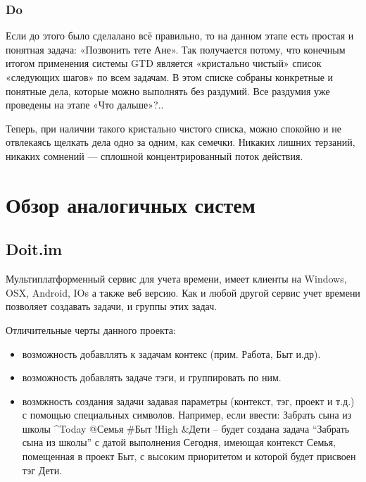 \subsubsection{Do }

Если до этого было сделалано всё правильно, то на данном этапе есть простая и понятная задача: «Позвонить тете Ане».
Так получается потому, что конечным итогом применения системы GTD является «кристально чистый» список «следующих шагов» по всем задачам. В этом списке собраны конкретные и понятные дела, которые можно выполнять без раздумий. Все раздумия уже проведены на этапе «Что дальше»?..

Теперь, при наличии такого кристально чистого списка, можно спокойно и не отвлекаясь щелкать дела одно за одним, как семечки. Никаких лишних терзаний, никаких сомнений — сплошной концентрированный поток действия. 

\section{Обзор аналогичных систем} 
\label{sec:practice:analogs}

\subsection{Doit.im}
\label{sub:practice:analogs:doit}
Мультиплатформенный  сервис для учета времени, имеет клиенты на Windows, OSX, Android, IOs а также веб версию. Как и любой другой сервис учет времени позволяет создавать задачи, и группы этих задач.

Отличительные черты данного проекта:

\begin{itemize}
  \item возможность добавллять к задачам контекс (прим. Работа, Быт и.др).
  \item возможность добавлять задаче тэги, и группировать по ним.
  \item возмжность создания задачи задавая параметры (контекст, тэг, проект и т.д.) с помощью специальных символов. Например, если ввести: Забрать сына из школы \string^Today @Семья \#Быт !High \&Дети –  будет создана задача “Забрать сына из школы” с датой выполнения Сегодня, имеющая контекст Семья, помещенная в проект Быт, с высоким приоритетом и которой будет присвоен тэг Дети.
\end{itemize}

